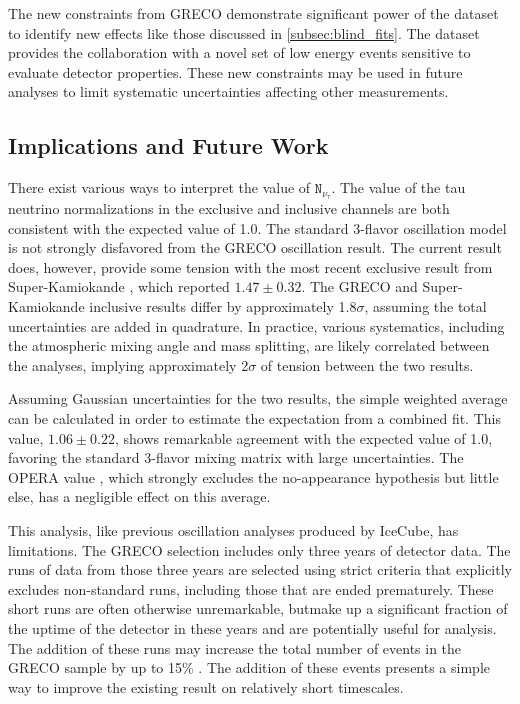 The new constraints from GRECO demonstrate significant power of the dataset to identify new effects like those discussed in \ref{subsec:blind_fits}.
The dataset provides the collaboration with a novel set of low energy events sensitive to evaluate detector properties.
These new constraints may be used in future analyses to limit systematic uncertainties affecting other measurements.

\label{subsec:implications}
\subsection{Implications and Future Work}
There exist various ways to interpret the value of $\mathtt{N_{\nu_\tau}}$. 
The value of the tau neutrino normalizations in the exclusive and inclusive channels  are both consistent with the expected value of 1.0.
The standard 3-flavor oscillation model is not strongly disfavored from the GRECO oscillation result.
The current result does, however, provide some tension with the most recent exclusive result from Super-Kamiokande , which reported $\mathtt{1.47\pm0.32}$. 
The GRECO and Super-Kamiokande inclusive results differ by approximately 1.8$\mathtt{\sigma}$, assuming the total uncertainties are added in quadrature.
In practice, various systematics, including the atmospheric mixing angle and mass splitting, are likely correlated between the analyses, implying approximately 2$\mathtt{\sigma}$ of tension between the two results.

Assuming Gaussian uncertainties for the two results, the simple weighted average can be calculated in order to estimate the expectation from a combined fit.
This value, $\mathtt{1.06\pm0.22}$, shows remarkable agreement with the expected value of 1.0, favoring the standard 3-flavor mixing matrix with large uncertainties.
The OPERA value , which strongly excludes the no-appearance hypothesis but little else, has a negligible effect on this average.

This analysis, like previous oscillation analyses produced by IceCube, has limitations.
The GRECO selection includes only three years of detector data.
The runs of data from those three years are selected using strict criteria that explicitly excludes non-standard runs, including those that are ended prematurely.
These short runs are often otherwise unremarkable, butmake up a significant fraction of the uptime of the detector in these years and are potentially useful for analysis.
The addition of these runs may increase the total number of events in the GRECO sample by up to 15\% .
The addition of these events presents a simple way to improve the existing result on relatively short timescales.

